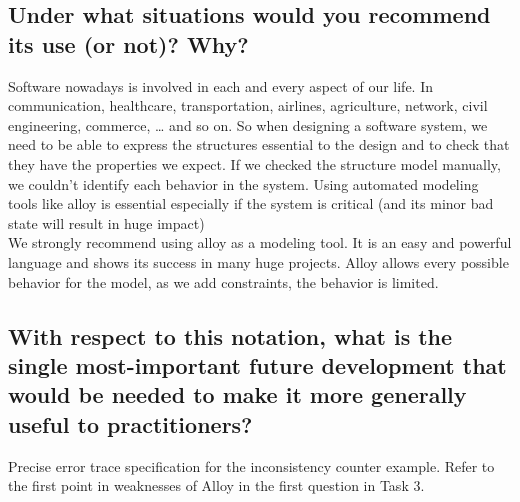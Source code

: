 \documentclass[titlepage]{article}
\begin{document}
\subsection{Under what situations would you recommend its use (or not)? Why?}
Software nowadays is involved in each and every aspect of our life. In communication, healthcare, transportation, airlines, agriculture, network, civil engineering, commerce, … and so on. So when designing a software system, we need to be able to express the structures essential to the design and to check that they have the properties we expect. If we checked the structure model manually, we couldn’t identify each behavior in the system. Using automated modeling tools like alloy is essential especially if the system is critical (and its minor bad state will result in huge impact)\\

We strongly recommend using alloy as a modeling tool. It is an easy and powerful language and shows its success in many huge projects. Alloy allows every possible behavior for the model, as we add constraints, the behavior is limited.

\subsection{With respect to this notation, what is the single most-important future development that would be needed to
	make it more generally useful to practitioners?}

Precise error trace specification for the inconsistency counter example. Refer to the first point in weaknesses of Alloy in the first question in Task 3.
\end{document}
